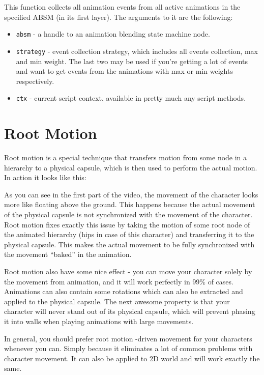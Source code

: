 \documentclass[
]{book}
\providecommand{\tightlist}{%
  \setlength{\itemsep}{0pt}\setlength{\parskip}{0pt}}
\theoremstyle{definition}
\theoremstyle{definition}
\theoremstyle{definition}
\theoremstyle{definition}
\theoremstyle{remark}
\begin{document}
This function collects all animation events from all active animations in the specified ABSM (in its first layer). The arguments to it are the following:

\begin{itemize}
\tightlist
\item
  \texttt{absm} - a handle to an animation blending state machine node.
\item
  \texttt{strategy} - event collection strategy, which includes all events collection, max and min weight. The last two may be used if you're getting a lot of events and want to get events from the animations with max or min weights respectively.
\item
  \texttt{ctx} - current script context, available in pretty much any script methods.
\end{itemize}

\section{Root Motion}\label{root-motion-1}

Root motion is a special technique that transfers motion from some node in a hierarchy to a physical capsule, which is then used to perform the actual motion. In action it looks like this:

As you can see in the first part of the video, the movement of the character looks more like floating above the ground. This happens because the actual movement of the physical capsule is not synchronized with the movement of the character. Root motion fixes exactly this issue by taking the motion of some root node of the animated hierarchy (hips in case of this character) and transferring it to the physical capsule. This makes the actual movement to be fully synchronized with the movement ``baked'' in the animation.

Root motion also have some nice effect - you can move your character solely by the movement from animation, and it will work perfectly in 99\% of cases. Animations can also contain some rotations which can also be extracted and applied to the physical capsule. The next awesome property is that your character will never stand out of its physical capsule, which will prevent phasing it into walls when playing animations with large movements.

In general, you should prefer root motion -driven movement for your characters whenever you can. Simply because it eliminates a lot of common problems with character movement. It can also be applied to 2D world and will work exactly the same.
\end{document}
